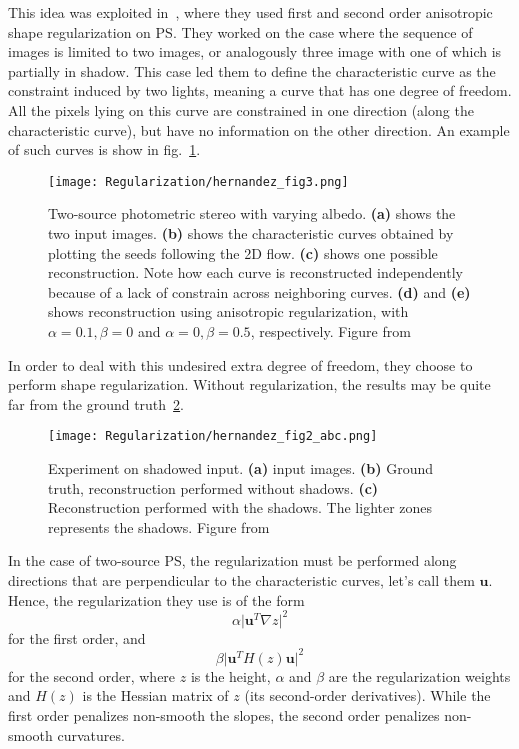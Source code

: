 This idea was exploited in~\cite{hernandez-pami-11}, where they used first and second order anisotropic shape regularization on PS. They worked on the case where the sequence of images is limited to two images, or analogously three image with one of which is partially in shadow. This case led them to define the characteristic curve as the constraint induced by two lights, meaning a curve that has one degree of freedom. All the pixels lying on this curve are constrained in one direction (along the characteristic curve), but have no information on the other direction. An example of such curves is show in fig.~\ref{fig:reg-her3}.

\begin{figure}
\centering
\texttt{[image: Regularization/hernandez\_fig3.png]}
\caption{Two-source photometric stereo with varying albedo. \textbf{(a)} shows the two input images. \textbf{(b)} shows the characteristic curves obtained by plotting the seeds following the 2D flow. \textbf{(c)} shows one possible reconstruction. Note how each curve is reconstructed independently because of a lack of constrain across neighboring curves. \textbf{(d)} and \textbf{(e)} shows reconstruction using anisotropic regularization, with $\alpha = 0.1, \beta = 0$ and $\alpha = 0, \beta = 0.5$, respectively. Figure from~\cite{hernandez-pami-11}}
\label{fig:reg-her3}
\end{figure}

In order to deal with this undesired extra degree of freedom, they choose to perform shape regularization. Without regularization, the results may be quite far from the ground truth~\ref{fig:reg-her2}. 

\begin{figure}
\centering
\texttt{[image: Regularization/hernandez\_fig2\_abc.png]}
\caption{Experiment on shadowed input. \textbf{(a)} input images. \textbf{(b)} Ground truth, reconstruction performed without shadows. \textbf{(c)} Reconstruction performed with the shadows. The lighter zones represents the shadows. Figure from~\cite{hernandez-pami-11}}
\label{fig:reg-her2}
\end{figure}

In the case of two-source PS, the regularization must be performed along directions that are perpendicular to the characteristic curves, let's call them $\mathbf{u}$. Hence, the regularization they use is of the form
\begin{equation}
\alpha \lvert \mathbf{u}^T \nabla z \rvert ^2
\end{equation}
for the first order, and 
\begin{equation}
\beta \lvert \mathbf{u}^T H(z) \mathbf{u} \rvert ^2
\end{equation}
for the second order, where $z$ is the height, $\alpha$ and $\beta$ are the regularization weights and $H(z)$ is the Hessian matrix of $z$ (its second-order derivatives). While the first order penalizes non-smooth the slopes, the second order penalizes non-smooth curvatures.

